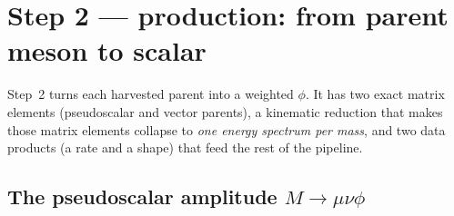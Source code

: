 \documentclass[11pt]{article}
\begin{document}
\section{Step 2 --- production: from parent meson to scalar}
\label{sec:production}

Step~2 turns each harvested parent into a weighted $\phi$. It has two exact
matrix elements (pseudoscalar and vector parents), a kinematic reduction that
makes those matrix elements collapse to \emph{one energy spectrum per mass}, and
two data products (a rate and a shape) that feed the rest of the pipeline.

\subsection{The pseudoscalar amplitude $M\to\mu\nu\phi$}
\label{sec:me}
\end{document}
